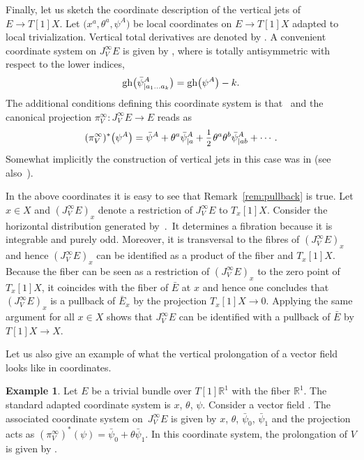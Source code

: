 \documentclass[10pt,a4paper]{amsart}
\numberwithin{equation}{section}
\theoremstyle{definition}
\newtheorem{Example}[Theorem]{Example}
\renewcommand{\tilde}{\widetilde}
\renewcommand{\d}{\partial}
\newcommand{\half}{\mathchoice{%
 \ffrac{1}{2}}{\frac{1}{2}}{\frac{1}{2}}{\frac{1}{2}}}
\newcommand{\ffrac}[2]{\raisebox{.5pt}%
 {\footnotesize$\displaystyle\frac{#1}{#2}$}\kern1pt}
\newcommand{\dl}[1]{\mathchoice{\ffrac{\d}{\d #1}}{\frac{\d}{\d #1}}{\ffrac{\d}{\d #1}}{\ffrac{\d}{\d #1}}}
\newcommand{\fR}{\mathbb{R}}
\newcommand{\total}{\textbf{tot\,}}
\newcommand{\vprol}{\tilde}
\begin{document}
Finally, let us sketch the coordinate description of the vertical jets of $E\rightarrow T[1]X$. Let $\bigl(x^a,\theta^a,\psi^A\bigr)$ be local coordinates on $E\rightarrow T[1]X$ adapted to local trivialization. Vertical total derivatives
are denoted by \smash{$D^{(\theta)}_a=\total{\dl{\theta^a}}$}. A convenient coordinate system on $J^{\infty}_VE$ is given by , where  is totally antisymmetric with respect to the lower indices,
\[
{\rm gh}\bigl(\bar\psi^A_{|a_1\dots a_k}\bigr)={\rm gh}\bigl(\psi^A\bigr)-k.
\]
 The additional conditions defining this coordinate system is that~\smash{$D^{(\theta)}_a=\dl{\theta^a}$} and the canonical projection $\pi_V^\infty:J^\infty_VE\to E$ reads as
\begin{equation}
\label{projection-vert-jets}
(\pi_V^\infty)^*\bigl(\psi^A\bigr)=\bar\psi^A+\theta^a \bar\psi^A_{|a}+\half \theta^a\theta^b\bar\psi^A_{|ab}+\cdots.
\end{equation}
Somewhat implicitly the construction of vertical jets in this case was in
\cite{Grigoriev:2022zlq, Grigoriev:2019ojp,Grigoriev:2020xec} (see also~\mbox{\cite{Barnich:2009jy,Barnich:2010sw,bonavolonta2013}}).


In the above coordinates it is easy to see that Remark~\ref{rem:pullback} is true. Let $x\in X$ and $({J^\infty_VE})_x$ denote a restriction of $J^\infty_VE$ to $T_x[1]X$. Consider the horizontal distribution generated by~.~It determines a fibration because it is integrable and purely odd. Moreover, it is transversal to the fibres of ${(J^\infty_V E)}_x$ and hence ${(J^\infty_V E)}_x$ can be identified as a product of the fiber and $T_x[1]X$. Because the fiber can be seen as a restriction of ${(J^\infty_V E)}_x$ to the zero point of $T_x[1]X$, it coincides with the fiber of $\bar E$ at $x$ and hence one concludes that ${(J^\infty_V E)}_x$
is a pullback of $\bar E_x$ by the projection $T_x[1]X \to 0$. Applying the same argument for all $x\in X$ shows that $J^\infty_V E$ can be identified with a pullback of $\bar E$ by $T[1]X\to X$.

Let us also give an example of what the vertical prolongation of a vector field looks like in coordinates.

\begin{Example}
 Let $E$ be a trivial bundle over $T[1]\fR^1$ with the fiber $\fR^1$. The standard adapted coordinate system is $x$, $\theta$, $\psi$. Consider a vector field \smash{$V=\theta \dl{\psi}$}. The associated coordinate system on~$J^\infty_V E$ is given by $x$, $\theta$, $\bar\psi_0$, $\bar\psi_1$ and the projection acts as $(\pi^\infty_V)^*(\psi)=\bar\psi_0+\theta \bar\psi_1 $. In this coordinate system, the prolongation \smash{$\vprol V$} of $V$ is given by \smash{$\vprol V=-\frac{\partial}{\partial \bar{\psi}_1}$}.
\end{Example}
\end{document}
